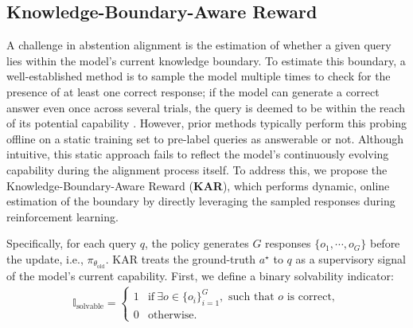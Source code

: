 \documentclass{article} %
\newcommand{\rewardname}{\textsc{KAR}}
\begin{document}
\subsection{Knowledge-Boundary-Aware Reward}
\label{sec:method_reward}
A challenge in abstention alignment is the estimation of whether a given query lies within the model's current knowledge boundary.
To estimate this boundary, a well-established method is to sample the model multiple times to check for the presence of at least one correct response; if the model can generate a correct answer even once across several trials, the query is deemed to be within the reach of its potential capability \citep{R-Tuning, KLCF, truthrl}.
However, prior methods typically perform this probing offline on a static training set to pre-label queries as answerable or not. 
Although intuitive, this static approach fails to reflect the model's continuously evolving capability during the alignment process itself. 
To address this, we propose the Knowledge-Boundary-Aware Reward (\textbf{\rewardname{}}), which performs dynamic, online estimation of the boundary by directly leveraging the sampled responses during reinforcement learning. 



Specifically, for each query $q$, the policy generates $G$ responses $\{o_1, \cdots, o_G\}$ before the update, i.e., $\pi_{\theta_{\text{old}}}$.
\rewardname{} treats the ground-truth $a^\star$ to $q$ as a supervisory signal of the model's current capability.
First, we define a binary solvability indicator:
\begin{equation}
		\begin{aligned}
            \mathbb{I}_{\text{solvable}} = 
                \begin{cases} 
                1 & \text{if}~\exists o \in \{o_i\}_{i=1}^G, \text{ such that } o \text{ is correct}, \\
                0 & \text{otherwise}.
                \end{cases}
		\end{aligned}
\end{equation}
\end{document}
